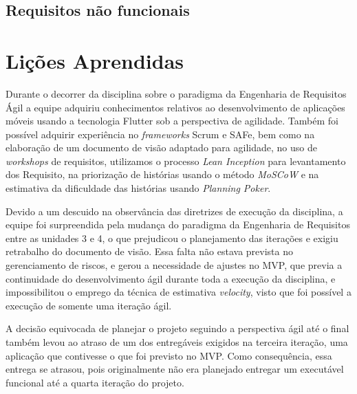 \documentclass[
	12pt,				%
	oneside,			%
	a4paper,			%
	english,			%
	brazil,				%
	]{abntex2}
\begin{document}
\section{Requisitos não funcionais}
\begin{table}[ht]
\end{table}

\chapter{Lições Aprendidas}
Durante o decorrer da disciplina sobre o paradigma da Engenharia de Requisitos Ágil a equipe adquiriu conhecimentos relativos ao desenvolvimento de aplicações móveis usando a tecnologia Flutter sob a perspectiva de agilidade. Também foi possível adquirir experiência no \textit{frameworks} Scrum e SAFe, bem como na elaboração de um documento de visão adaptado para agilidade, no uso de \textit{workshops} de requisitos, utilizamos o processo  \textit{Lean Inception} para levantamento dos Requisito, na priorização de histórias usando o método \textit{MoSCoW} e na estimativa da dificuldade das histórias usando \textit{Planning Poker}.

Devido a um descuido na observância das diretrizes de execução da disciplina, a equipe foi surpreendida pela mudança do paradigma da Engenharia de Requisitos entre as unidades 3 e 4, o que prejudicou o planejamento das iterações e exigiu retrabalho do documento de visão. Essa falta não estava prevista no gerenciamento de riscos, e gerou a necessidade de ajustes no MVP, que previa a continuidade do desenvolvimento ágil durante toda a execução da disciplina, e impossibilitou o emprego da técnica de estimativa \textit{velocity}, visto que foi possível a execução de somente uma iteração ágil.

A decisão equivocada de planejar o projeto seguindo a perspectiva ágil até o final também levou ao atraso de um dos entregáveis exigidos na terceira iteração, uma aplicação que contivesse o que foi previsto no MVP. Como consequência, essa entrega se atrasou, pois originalmente não era planejado entregar um executável funcional até a quarta iteração do projeto.
\end{document}
